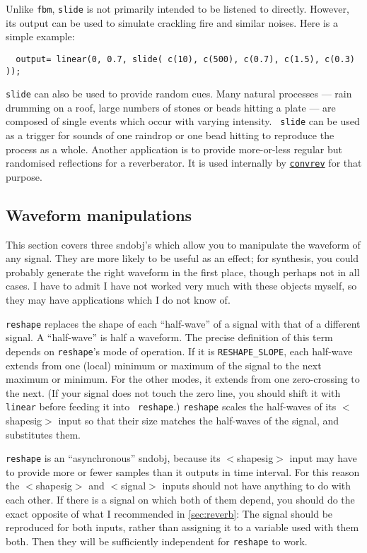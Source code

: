 \documentclass{article}
\def\bv{\begin{verbatim}}
\begin{document}
Unlike {\tt fbm}, {\tt slide} is not primarily intended to be listened to
directly.  However, its output can be used to simulate crackling fire and
similar noises.  Here is a simple example:

\bv
  output= linear(0, 0.7, slide( c(10), c(500), c(0.7), c(1.5), c(0.3) ));
\end{verbatim}

{\tt slide} can also be used to provide random cues.  Many natural processes
--- rain drumming on a roof, large numbers of stones or beads hitting a plate
--- are composed of single events which occur with varying intensity.  {\tt
slide} can be used as a trigger for sounds of one raindrop or one bead hitting
to reproduce the process as a whole.  Another application is to provide
more-or-less regular but randomised reflections for a reverberator.  It is used
internally by \hyperref[sec:reverb]{{\tt convrev}} for that purpose.


\subsection{Waveform manipulations}
\label{sec:granular}

This section covers three sndobj's which allow you to manipulate the waveform
of any signal.  They are more likely to be useful as an effect; for synthesis,
you could probably generate the right waveform in the first place, though
perhaps not in all cases.  I have to admit I have not worked very much with
these objects myself, so they may have applications which I do not know of.

{\tt reshape} replaces the shape of each ``half-wave'' of a signal with that of
a different signal.  A ``half-wave'' is half a waveform.  The precise
definition of this term depends on {\tt reshape}'s mode of operation.  If it is
{\tt RESHAPE\_SLOPE}, each half-wave extends from one (local) minimum or maximum
of the signal to the next maximum or minimum.  For the other modes, it extends
from one zero-crossing to the next.  (If your signal does not touch the zero
line, you should shift it with {\tt linear} before feeding it into {\tt
reshape}.)  {\tt reshape} scales the half-waves of its $<$shapesig$>$ input
so that their size matches the half-waves of the signal, and substitutes them.

{\tt reshape} is an ``asynchronous'' sndobj, because its $<$shapesig$>$ input
may have to provide more or fewer samples than it outputs in time interval.
For this reason the $<$shapesig$>$ and $<$signal$>$ inputs should not have
anything to do with each other.  If there is a signal on which both of them
depend, you should do the exact opposite of what I recommended in
\autoref{sec:reverb}: The signal should be reproduced for both inputs, rather
than assigning it to a variable used with them both.  Then they will be
sufficiently independent for {\tt reshape} to work.
\end{document}
